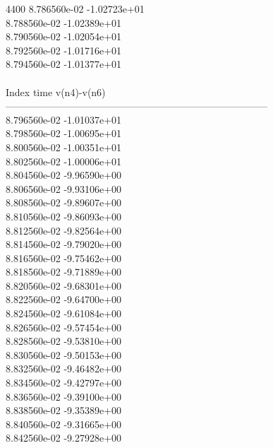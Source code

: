 4400	8.786560e-02	-1.02723e+01	\\ 	8.788560e-02	-1.02389e+01	\\ 	8.790560e-02	-1.02054e+01	\\ 	8.792560e-02	-1.01716e+01	\\ 	8.794560e-02	-1.01377e+01	\\ \hline
\\ \hline
Index   time            v(n4)-v(n6)     \\ \hline
--------------------------------------------------------------------------------\\ 	8.796560e-02	-1.01037e+01	\\ 	8.798560e-02	-1.00695e+01	\\ 	8.800560e-02	-1.00351e+01	\\ 	8.802560e-02	-1.00006e+01	\\ 	8.804560e-02	-9.96590e+00	\\ 	8.806560e-02	-9.93106e+00	\\ 	8.808560e-02	-9.89607e+00	\\ 	8.810560e-02	-9.86093e+00	\\ 	8.812560e-02	-9.82564e+00	\\ 	8.814560e-02	-9.79020e+00	\\ 	8.816560e-02	-9.75462e+00	\\ 	8.818560e-02	-9.71889e+00	\\ 	8.820560e-02	-9.68301e+00	\\ 	8.822560e-02	-9.64700e+00	\\ 	8.824560e-02	-9.61084e+00	\\ 	8.826560e-02	-9.57454e+00	\\ 	8.828560e-02	-9.53810e+00	\\ 	8.830560e-02	-9.50153e+00	\\ 	8.832560e-02	-9.46482e+00	\\ 	8.834560e-02	-9.42797e+00	\\ 	8.836560e-02	-9.39100e+00	\\ 	8.838560e-02	-9.35389e+00	\\ 	8.840560e-02	-9.31665e+00	\\ 	8.842560e-02	-9.27928e+00	\\ \hline
